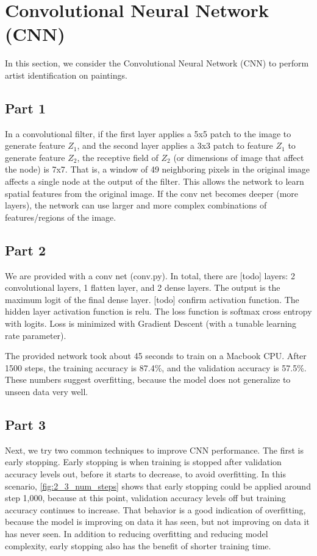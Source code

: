 \section{Convolutional Neural Network (CNN)} \label{sec:prob2}
In this section, we consider the Convolutional Neural Network (CNN) to perform artist identification on paintings.

\subsection{Part 1}
In a convolutional filter, if the first layer applies a 5x5 patch to the image to generate feature $Z_1$, and the second layer applies a 3x3 patch to feature $Z_1$ to generate feature $Z_2$, the receptive field of $Z_2$ (or dimensions of image that affect the node) is 7x7.
That is, a window of 49 neighboring pixels in the original image affects a single node at the output of the filter.
This allows the network to learn spatial features from the original image.
If the conv net becomes deeper (more layers), the network can use larger and more complex combinations of features/regions of the image.

\subsection{Part 2}
We are provided with a conv net (conv.py).
In total, there are [todo] layers: 2 convolutional layers, 1 flatten layer, and 2 dense layers.
The output is the maximum logit of the final dense layer.
[todo] confirm activation function. The hidden layer activation function is relu.
The loss function is softmax cross entropy with logits.
Loss is minimized with Gradient Descent (with a tunable learning rate parameter).

The provided network took about 45 seconds to train on a Macbook CPU.
After 1500 steps, the training accuracy is 87.4\%, and the validation accuracy is 57.5\%.
These numbers suggest overfitting, because the model does not generalize to unseen data very well.

\subsection{Part 3}
Next, we try two common techniques to improve CNN performance.
The first is early stopping.
Early stopping is when training is stopped after validation accuracy levels out, before it starts to decrease, to avoid overfitting.
In this scenario, \cref{fig:2_3_num_steps} shows that early stopping could be applied around step 1,000, because at this point, validation accuracy levels off but training accuracy continues to increase.
That behavior is a good indication of overfitting, because the model is improving on data it has seen, but not improving on data it has never seen. 
In addition to reducing overfitting and reducing model complexity, early stopping also has the benefit of shorter training time.

